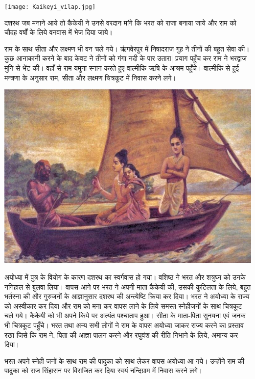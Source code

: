 \documentclass[makeidx, 10pt, oneside, onecolumn, openright, final, svgnames, dvipsnames, extrafontsizes]{memoir}
\begin{document}
 \begin{center}
\texttt{[image: Kaikeyi\_vilap.jpg]}
\end{center}

दशरथ जब मनाने आये तो कैकेयी ने उनसे वरदान मांगे कि भरत को राजा बनाया जाये और राम को चौदह वर्षों के लिये वनवास में भेज दिया जाये।

राम के साथ सीता और लक्ष्मण भी वन चले गये। ऋंगवेरपुर में निषादराज गुह ने तीनों की बहुत सेवा की। कुछ आनाकानी करने के बाद केवट ने तीनों को गंगा नदी के पार उतारा| प्रयाग पहुँच कर राम ने भरद्वाज मुनि से भेंट की। वहाँ से राम यमुना स्नान करते हुए वाल्मीकि ऋषि के आश्रम पहुँचे। वाल्मीकि से हुई मन्त्रणा के अनुसार राम, सीता और लक्ष्मण चित्रकूट में निवास करने लगे।

 \begin{center}
\includegraphics[scale=0.4]{Sree_Rama_Crossing_Sarayu_river.jpg}
\end{center}


अयोध्या में पुत्र के वियोग के कारण दशरथ का स्वर्गवास हो गया। वशिष्ठ ने भरत और शत्रुघ्न को उनके ननिहाल से बुलवा लिया। वापस आने पर भरत ने अपनी माता कैकेयी की, उसकी कुटिलता के लिये, बहुत भर्तस्ना की और गुरुजनों के आज्ञानुसार दशरथ की अन्त्येष्टि क्रिया कर दिया। भरत ने अयोध्या के राज्य को अस्वीकार कर दिया और राम को मना कर वापस लाने के लिये समस्त स्नेहीजनों के साथ चित्रकूट चले गये। कैकेयी को भी अपने किये पर अत्यंत पश्चाताप हुआ। सीता के माता-पिता सुनयना एवं जनक भी चित्रकूट पहुँचे। भरत तथा अन्य सभी लोगों ने राम के वापस अयोध्या जाकर राज्य करने का प्रस्ताव रखा जिसे कि राम ने, पिता की आज्ञा पालन करने और रघुवंश की रीति निभाने के लिये, अमान्य कर दिया।

भरत अपने स्नेही जनों के साथ राम की पादुका को साथ लेकर वापस अयोध्या आ गये। उन्होंने राम की पादुका को राज सिंहासन पर विराजित कर दिया स्वयं नन्दिग्राम में निवास करने लगे। 
\end{document}
